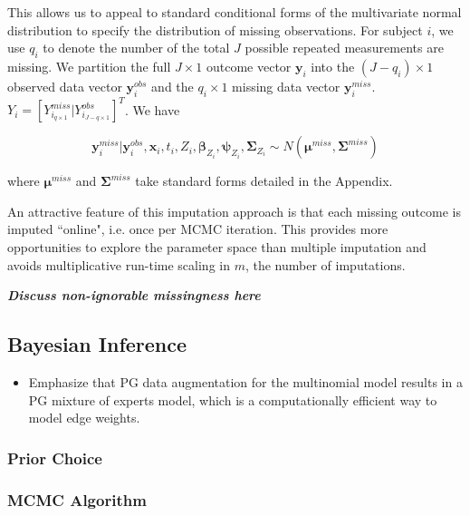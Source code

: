 \documentclass[useAMS,referee]{biom}
\begin{document}
This allows us to appeal to standard conditional forms of the multivariate normal distribution to specify the distribution of missing observations. For subject $i$, we use $q_i$ to denote the number of the total $J$ possible repeated measurements are missing. We partition the full $J \times 1$ outcome vector $\mathbf{y}_i$ into the $(J - q_i) \times 1$ observed data vector $\mathbf{y}_i^{obs}$ and the $q_i \times 1$ missing data vector $\mathbf{y}_i^{miss}$. $Y_i = [Y^{miss}_{i_{q \times 1}} | Y^{obs}_{i_{J - q \times 1}}]^T$. We have

$$\mathbf{y}_i^{miss}|\mathbf{y}_i^{obs},\mathbf{x}_i,t_i,Z_i,\boldsymbol\beta_{Z_i},\boldsymbol\psi_{Z_i},\boldsymbol\Sigma_{Z_i} \sim N(\boldsymbol\mu^{miss},\boldsymbol\Sigma^{miss})$$

where $\boldsymbol\mu^{miss}$ and $\boldsymbol\Sigma^{miss}$ take standard forms detailed in the Appendix. 

An attractive feature of this imputation approach is that each missing outcome is imputed ``online", i.e. once per MCMC iteration. This provides more opportunities to explore the parameter space than multiple imputation and avoids multiplicative run-time scaling in $m$, the number of imputations.

\textit{\textbf{Discuss non-ignorable missingness here}}

\subsection{Bayesian Inference}

\begin{itemize}

\item Emphasize that PG data augmentation for the multinomial model results in a PG mixture of experts model, which is a computationally efficient way to model edge weights. 

\end{itemize}

\subsubsection{Prior Choice}

\subsubsection{MCMC Algorithm}
\end{document}
